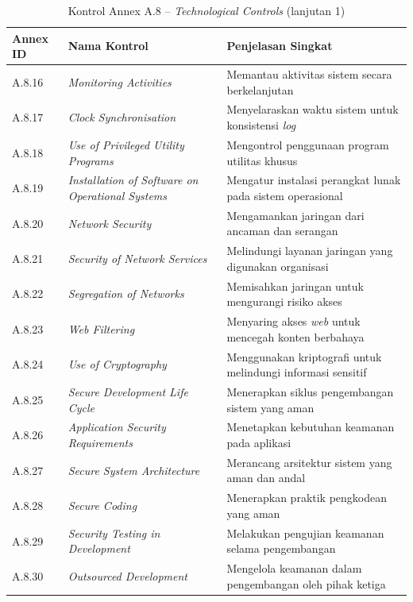 \begin{table}[H]
\centering
\small
\caption{Kontrol Annex A.8 -- \textit{Technological Controls} (lanjutan 1) \cite{isoiec20227001}}
\label{tab:annex_a8_lanjutan1}
\begin{tabular}{|P{1.6cm}|P{5.0cm}|P{6.4cm}|}
\hline
\textbf{Annex ID} & \textbf{Nama Kontrol} & \textbf{Penjelasan Singkat} \\
\hline
A.8.16 & \textit{Monitoring Activities}                                        & Memantau aktivitas sistem secara berkelanjutan \\
\hline
A.8.17 & \textit{Clock Synchronisation}                                        & Menyelaraskan waktu sistem untuk konsistensi \textit{log} \\
\hline
A.8.18 & \textit{Use of Privileged Utility Programs}                           & Mengontrol penggunaan program utilitas khusus \\
\hline
A.8.19 & \textit{Installation of Software on Operational Systems}              & Mengatur instalasi perangkat lunak pada sistem operasional \\
\hline
A.8.20 & \textit{Network Security}                                             & Mengamankan jaringan dari ancaman dan serangan \\
\hline
A.8.21 & \textit{Security of Network Services}                                 & Melindungi layanan jaringan yang digunakan organisasi \\
\hline
A.8.22 & \textit{Segregation of Networks}                                      & Memisahkan jaringan untuk mengurangi risiko akses \\
\hline
A.8.23 & \textit{Web Filtering}                                                & Menyaring akses \textit{web} untuk mencegah konten berbahaya \\
\hline
A.8.24 & \textit{Use of Cryptography}                                          & Menggunakan kriptografi untuk melindungi informasi sensitif \\
\hline
A.8.25 & \textit{Secure Development Life Cycle}                                & Menerapkan siklus pengembangan sistem yang aman \\
\hline
A.8.26 & \textit{Application Security Requirements}                            & Menetapkan kebutuhan keamanan pada aplikasi \\
\hline
A.8.27 & \textit{Secure System Architecture}                                   & Merancang arsitektur sistem yang aman dan andal \\
\hline
A.8.28 & \textit{Secure Coding}                                                & Menerapkan praktik pengkodean yang aman \\
\hline
A.8.29 & \textit{Security Testing in Development}                              & Melakukan pengujian keamanan selama pengembangan \\
\hline
A.8.30 & \textit{Outsourced Development}                                       & Mengelola keamanan dalam pengembangan oleh pihak ketiga \\
\hline
\end{tabular}
\end{table}

